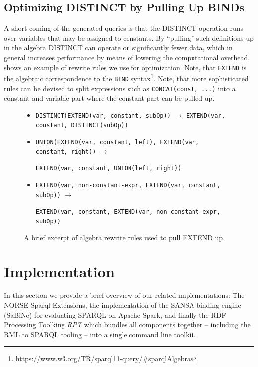 \subsection{Optimizing DISTINCT by Pulling Up BINDs}
A short-coming of the generated queries is that the DISTINCT operation runs over variables that may be assigned to constants.
By ``pulling'' such definitions up in the algebra DISTINCT can operate on significantly fewer data, which in general increases performance by means of lowering the computational overhead.  shows an example of rewrite rules we use for optimization. Note, that \texttt{EXTEND} is the algebraic correspondence to the \texttt{BIND} syntax\footnote{\url{https://www.w3.org/TR/sparql11-query/\#sparqlAlgebra}}.
Note, that more sophisticated rules can be devised to split expressions such as \lstinline{CONCAT(const, ...)} into a constant and variable part where the constant part can be pulled up.

\begin{figure}[!h]
\begin{itemize}
    \setlength\itemsep{-0.5em}
    \item \lstinline{DISTINCT(EXTEND(var, constant, subOp))} $\rightarrow$ \lstinline{EXTEND(var, constant, DISTINCT(subOp))}
    \item \lstinline{UNION(EXTEND(var, constant, left), EXTEND(var, constant, right))} $\rightarrow$

    \hspace{1cm}\lstinline{EXTEND(var, constant, UNION(left, right))}
    \item \lstinline{EXTEND(var, non-constant-expr, EXTEND(var, constant, subOp))} $\rightarrow$

    \hspace{1cm}\lstinline{EXTEND(var, constant, EXTEND(var, non-constant-expr, subOp))}
\end{itemize}
\vspace*{-5mm}
\caption{A brief excerpt of algebra rewrite rules used to pull EXTEND up.}
\label{fig:pull-extend}
\end{figure}

\section{Implementation}
\label{sec:implementation}
In this section we provide a brief overview of our related implementations: The NORSE Sparql Extensions, the implementation of the SANSA binding engine (SaBiNe) for evaluating SPARQL on Apache Spark, and finally the RDF Processing Toolking \emph{RPT} which bundles all components together -- including the RML to SPARQL tooling -- into a single command line toolkit.

